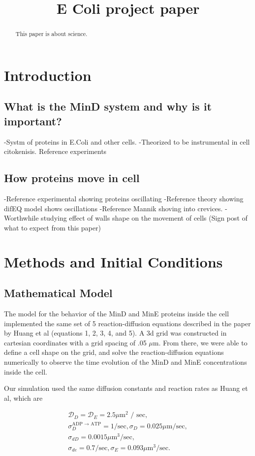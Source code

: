 \documentclass[letterpaper,twocolumn,amsmath,amssymb,pre]{revtex4-1}
\begin{document}
\title{E Coli project paper}

\begin{abstract}
  This paper is about science.
\end{abstract}

\section{Introduction}
\subsection{What is the MinD system and why is it important?}
-Systm of proteins in E.Coli and other cells.
-Theorized to be instrumental in cell citokenisis. Reference experiments
\subsection{How proteins move in cell}
-Reference experimental showing proteins oscillating
-Reference theory showing difEQ model shows oscillations
-Reference Mannik shoving into crevices.
-Worthwhile studying effect of walls shape on the movement of cells
(Sign post of what to expect from this paper)

\section{Methods and Initial Conditions}
\subsection{Mathematical Model} %
The model for the behavior of the MinD and MinE proteins inside the cell
implemented the same set of 5 reaction-diffusion equations described in the paper
by Huang et al (equations 1, 2, 3, 4, and 5). A 3d grid was constructed in
cartesian coordinates with a grid spacing of .05 $\mu$m. From there, we
were able to define a cell shape on the grid, and solve the
reaction-diffusion equations numerically to observe the time evolution of
the MinD and MinE concentrations inside the cell.

Our simulation used the same diffusion constants and reaction rates as
Huang et al, which are

\begin{gather*} %
  \mathcal{D}_D = \mathcal{D}_{E}  = 2.5 \mu \textrm{m$^2$ / sec}, \\
  \sigma_D^{\textrm{ADP $\rightarrow$ ATP}}  = 1/\textrm{sec},  \sigma_D = 0.025 \mu \textrm{m/sec}, \\
  \sigma_{dD}  = 0.0015 \mu \textrm{m$^3$/sec}, \\
  \sigma_{de}  = 0.7/\textrm{sec}, \sigma_E = 0.093 \mu \textrm{m$^3$/sec}.
\end{gather*}
\end{document}
